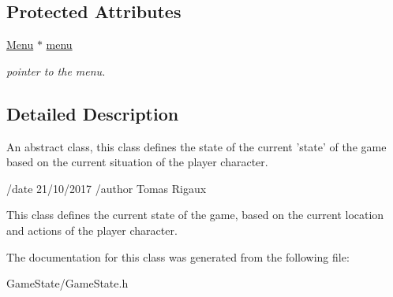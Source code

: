 \subsection*{Protected Attributes}
\begin{DoxyCompactItemize}
\item 
\hypertarget{classGameState_aebc12d6e90edfbe51a571858f6288f93}{\hyperlink{classMenu}{Menu} $\ast$ \hyperlink{classGameState_aebc12d6e90edfbe51a571858f6288f93}{menu}}\label{classGameState_aebc12d6e90edfbe51a571858f6288f93}

\begin{DoxyCompactList}\small\item\em pointer to the menu. \end{DoxyCompactList}\end{DoxyCompactItemize}


\subsection{Detailed Description}
An abstract class, this class defines the state of the current 'state' of the game based on the current situation of the player character. 

/date 21/10/2017 /author Tomas Rigaux

This class defines the current state of the game, based on the current location and actions of the player character. 

The documentation for this class was generated from the following file\-:\begin{DoxyCompactItemize}
\item 
Game\-State/Game\-State.\-h\end{DoxyCompactItemize}
